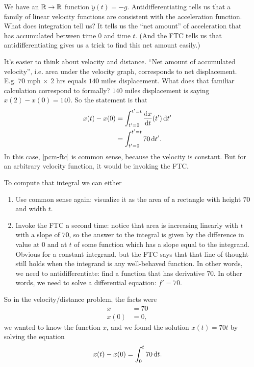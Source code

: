We have an $\mathbb{R} \to \mathbb{R}$ function $\ddot{y}(t) = -g$. Antidifferentiating tells us that a family of
linear velocity functions are consistent with the acceleration function. What does integration
tell us? It tells us the ``net amount'' of acceleration that has accumulated between time $0$ and
time $t$. (And the FTC tells us that antidifferentiating gives us a trick to find this net amount
easily.)

It's easier to think about velocity and distance. ``Net amount of accumulated velocity'',
i.e. area under the velocity graph, corresponds to net displacement. E.g. $70$ mph $\times$ $2$
hrs equals $140$ miles displacement. What does that familiar calculation correspond to formally?
$140$ miles displacement is saying $x(2) - x(0) = 140$. So the statement is that
\begin{align}
    x(t) - x(0) &= \int_{t'=0}^{t'=t} \dxdt(t') \dt' \label{pcm-ftc} \\
                &= \int_{t'=0}^{t'=t} 70 \dt'.       \nonumber
\end{align}
In this case, \eqref{pcm-ftc} is common sense, because the velocity is constant. But for an
arbitrary velocity function, it would be invoking the FTC.

To compute that integral we can either
\begin{enumerate}
\item Use common sense again: visualize it as the area of a rectangle with height $70$ and width
  $t$.
\item Invoke the FTC a second time: notice that area is increasing linearly with $t$ with a slope
  of $70$, so the answer to the integral is given by the difference in value at $0$ and at $t$ of
  some function which has a slope equal to the integrand. Obvious for a constant integrand, but
  the FTC says that that line of thought still holds when the integrand is any well-behaved
  function. In other words, we need to antidifferentiate: find a function that has derivative
  $70$. In other words, we need to solve a differential equation: $f' = 70$.
\end{enumerate}

So in the velocity/distance problem, the facts were
\begin{align*}
    \dot{x} &= 70 \\
    x(0)    &= 0,
\end{align*}
we wanted to know the function $x$, and we found the solution $x(t) = 70t$ by solving the equation
\begin{align*}
    x(t) - x(0) = \int_0^t 70 \dt.
\end{align*}

